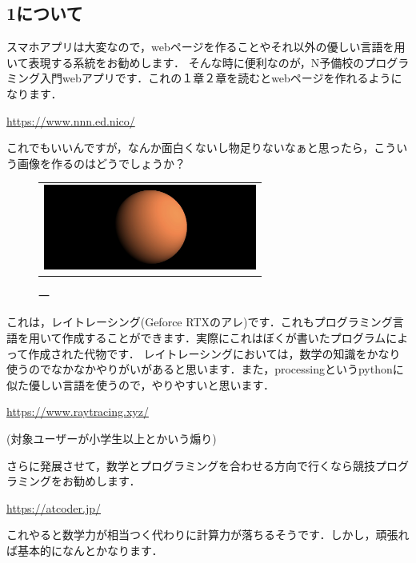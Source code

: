 \documentclass[10pt,twocolumn]{jsarticle}
\begin{document}
\subsection{1について}
スマホアプリは大変なので，webページを作ることやそれ以外の優しい言語を用いて表現する系統をお勧めします．
そんな時に便利なのが，N予備校のプログラミング入門webアプリです．これの１章２章を読むとwebページを作れるようになります．

\url{https://www.nnn.ed.nico/}

\hrulefill

これでもいいんですが，なんか面白くないし物足りないなぁと思ったら，こういう画像を作るのはどうでしょうか？
\begin{figure}[h]
  \begin{tabular}{c}
  \begin{minipage}[t]{1\hsize}
  \begin{center}
  \includegraphics[clip,width=70mm]{ray.png}
  \caption{一}
  \label{fig:sobelx_one}
  \end{center}
  \end{minipage}
  \end{tabular}
  \end{figure}

これは，レイトレーシング(Geforce RTXのアレ)です．これもプログラミング言語を用いて作成することができます．実際にこれはぼくが書いたプログラムによって作成された代物です．
レイトレーシングにおいては，数学の知識をかなり使うのでなかなかやりがいがあると思います．また，processingというpythonに似た優しい言語を使うので，やりやすいと思います．

\url{https://www.raytracing.xyz/}

(対象ユーザーが小学生以上とかいう煽り)

\hrulefill

さらに発展させて，数学とプログラミングを合わせる方向で行くなら競技プログラミングをお勧めします．

\url{https://atcoder.jp/}

これやると数学力が相当つく代わりに計算力が落ちるそうです．しかし，頑張れば基本的になんとかなります．
\end{document}
